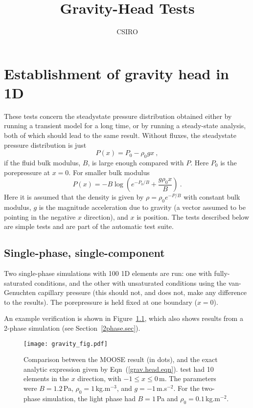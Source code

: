 \documentclass[]{scrreprt}
\begin{document}
\title{Gravity-Head Tests}
\author{CSIRO}
\maketitle

\tableofcontents

\chapter{Establishment of gravity head in 1D}

These tests concern the steadystate pressure distribution obtained
either by running a transient model for a long time, or by running a
steady-state analysis, both of which should lead to the same result.
Without fluxes, the steadystate pressure distribution is just
\begin{equation}
P(x) = P_{0} - \rho_{0} g x \ ,
\end{equation}
if the fluid bulk modulus, $B$, is large enough compared with $P$.
Here $P_{0}$ is the porepressure at $x=0$.  For smaller bulk modulus
\begin{equation}
P(x) = -B \log\left( e^{-P_{0}/B} + \frac{g\rho_{0}x}{B} \right) \ .
\label{grav.head.eqn}
\end{equation}
Here it is assumed that the density is given by $\rho = \rho_{0}e^{-P/B}$
with constant bulk modulus, $g$ is the
magnitude acceleration due to gravity (a vector assumed to be pointing in the
negative $x$ direction), and $x$ is position.  The tests described below
are simple tests and are part of the automatic test suite.

\section{Single-phase, single-component}
\label{1phase1comp.sec}

Two single-phase simulations with 100 1D elements are run: one with
fully-saturated conditions, and the other with unsaturated conditions
using the van-Genuchten capillary pressure (this should not, and does
not, make any difference to the results).  The porepressure is held
fixed at one boundary ($x=0$).

An example verification is shown in Figure~\ref{gh.fig}, which also
shows results from a 2-phase simulation (see Section~\ref{2phase.sec}).

\begin{figure}[htb]
\centering
\texttt{[image: gravity\_fig.pdf]}
\caption{Comparison between the MOOSE result (in dots), and the
  exact analytic expression given by Eqn~(\ref{grav.head.eqn}).
  test had 10 elements in the $x$ direction, with $-1\leq x \leq
  0$\,m.  The parameters were $B=1.2$\,Pa, $\rho_{0}=1$\,kg.m$^{-3}$,
  and $g=-1$\,m.s$^{-2}$.  For the two-phase simulation, the light
  phase had $B=1$\,Pa and $\rho_{0}=0.1$\,kg.m$^{-2}$.}
\label{gh.fig}
\end{figure}
\end{document}
